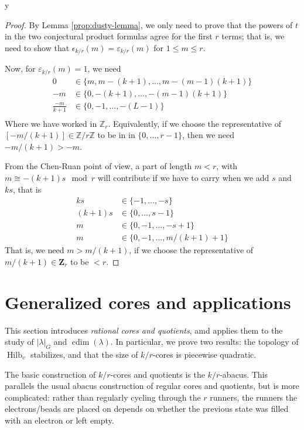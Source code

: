 y\documentclass{amsart}[12pt]
\theoremstyle{definition}
\newcommand{\Z}{\mathbf{Z}}
\DeclareMathOperator{\Hilb}{Hilb}
\DeclareMathOperator{\cdim}{cdim}
\begin{document}
\begin{proof}
By Lemma \ref{prop:dusty-lemma}, we only need to prove that the powers of $t$ in the two conjectural product formulas agree for the first $r$ terms; that is, we need to show that $\epsilon_{k/r}(m)=\varepsilon_{k/r}(m)$ for $1\leq m\leq r$.  

Now, for $\varepsilon_{k/r}(m)=1$, we need 
\begin{align*}
0 &\in \{m, m-(k+1),\dots, m-(m-1)(k+1) \} \\
-m &\in \{0, -(k+1),\dots,-(m-1)(k+1) \} \\
\frac{-m}{k+1} &\in \{0, -1, \dots, -(L-1) \} \\
\end{align*}
Where we have worked in $\mathbb{Z}_r$.  Equivalently, if we choose the representative of $[-m/(k+1)]\in \mathbb{Z}/r\mathbb{Z}$ to be in in $\{0,\dots, r-1\}$, then we need $-m/(k+1)>-m$.

From the Chen-Ruan point of view, a part of length $m<r$, with $ m\cong-(k+1)s\mod r$ will contribute if we have to carry when we add $s$ and $ks$, that is 
\begin{align*}
k s &\in\{ -1,\dots, -s \}\\
(k+1)s &\in\{ 0,\dots, s-1\} \\
m&\in\{ 0,-1,\dots, -s+1\} \\
m& \in \{0, -1,\dots, m/(k+1)+1\}
\end{align*}
That is, we need $m>m/(k+1)$, if we choose the representative of $m/(k+1)\in\Z_r$ to be $<r$.

\end{proof}


\section{Generalized cores and applications}

This section introduces \emph{rational cores and quotients}, amd applies them to the study of $|\lambda|_G$ and $\cdim(\lambda)$.  In particular, we prove two results: the topology of $\Hilb_v$ stabilizes, and that the size of $k/r$-cores is piecewise quadratic.

The basic construction of $k/r$-cores and quotients is the $k/r$-abacus.  This parallels the usual abacus construction of regular cores and quotients, but is more complicated: rather than regularly cycling through the $r$ runners, the runners the electrons/beads are placed on depends on whether the previous state was filled with an electron or left empty.  
\end{document}
